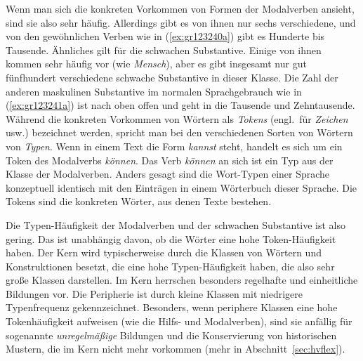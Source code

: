 Wenn man sich die konkreten Vorkommen von Formen der Modalverben ansieht, sind sie also sehr häufig.
Allerdings gibt es von ihnen nur sechs verschiedene, und von den gewöhnlichen Verben wie in (\ref{ex:gr123240a}) gibt es Hunderte bis Tausende.
Ähnliches gilt für die schwachen Substantive.
Einige von ihnen kommen sehr häufig vor (wie \textit{Mensch}), aber es gibt insgesamt nur gut fünfhundert verschiedene schwache Substantive in dieser Klasse.
Die Zahl der anderen maskulinen Substantive im normalen Sprachgebrauch wie in (\ref{ex:gr123241a}) ist nach oben offen und geht in die Tausende und Zehntausende.
Während die konkreten Vorkommen von Wörtern als \textit{Tokens} (engl.\ für \textit{Zeichen} usw.) bezeichnet werden, spricht man bei den verschiedenen Sorten von Wörtern von \textit{Typen}.
Wenn in einem Text die Form \textit{kannst} steht, handelt es sich um ein Token des Modalverbs \textit{können}.
Das Verb \textit{können} an sich ist ein Typ aus der Klasse der Modalverben.
Anders gesagt sind die Wort-Typen einer Sprache konzeptuell identisch mit den Einträgen in einem Wörterbuch dieser Sprache.
Die Tokens sind die konkreten Wörter, aus denen Texte bestehen.

Die Typen-Häufigkeit der Modalverben und der schwachen Substantive ist also gering.
Das ist unabhängig davon, ob die Wörter eine hohe Token-Häufigkeit haben.
Der Kern wird typischerweise durch die Klassen von Wörtern und Konstruktionen besetzt, die eine hohe Typen-Häufigkeit haben, die also sehr große Klassen darstellen.
Im Kern herrschen besonders regelhafte und einheitliche Bildungen vor.
Die Peripherie ist durch kleine Klassen mit niedrigere Typenfrequenz gekennzeichnet.
Besonders, wenn periphere Klassen eine hohe Tokenhäufigkeit aufweisen (wie die Hilfs- und Modalverben), sind sie anfällig für sogenannte \textit{unregelmäßige} Bildungen und die Konservierung von historischen Mustern, die im Kern nicht mehr vorkommen (mehr in Abschnitt~\ref{sec:hvflex}).


